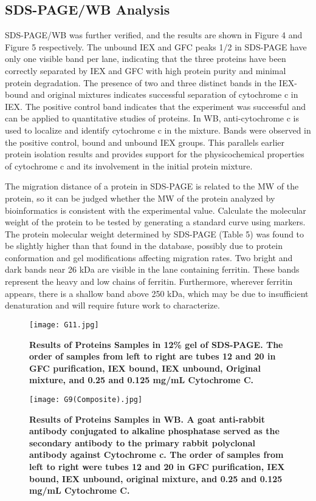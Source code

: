 \documentclass[a4paper,10pt]{article}
\begin{document}
\begin{multicols}{2}
\subsection{SDS-PAGE/WB Analysis}
SDS-PAGE/WB was further verified, and the results are shown in Figure 4 and Figure 5 respectively. The unbound IEX and GFC peaks 1/2 in SDS-PAGE have only one visible band per lane, indicating that the three proteins have been correctly separated by IEX and GFC with high protein purity and minimal protein degradation. The presence of two and three distinct bands in the IEX-bound and original mixtures indicates successful separation of cytochrome c in IEX. The positive control band indicates that the experiment was successful and can be applied to quantitative studies of proteins. In WB, anti-cytochrome c is used to localize and identify cytochrome c in the mixture. Bands were observed in the positive control, bound and unbound IEX groups. This parallels earlier protein isolation results and provides support for the physicochemical properties of cytochrome c and its involvement in the initial protein mixture.


The migration distance of a protein in SDS-PAGE is related to the MW of the protein, so it can be judged whether the MW of the protein analyzed by bioinformatics is consistent with the experimental value. Calculate the molecular weight of the protein to be tested by generating a standard curve using markers. The protein molecular weight determined by SDS-PAGE (Table 5) was found to be slightly higher than that found in the database, possibly due to protein conformation and gel modifications affecting migration rates. Two bright and dark bands near 26 kDa are visible in the lane containing ferritin. These bands represent the heavy and low chains of ferritin. Furthermore, wherever ferritin appears, there is a shallow band above 250 kDa, which may be due to insufficient denaturation and will require future work to characterize.


\begin{figure}[H]
\centering
\texttt{[image: G11.jpg]}
\caption{\scriptsize \textbf{Results of Proteins Samples in 12\% gel of SDS-PAGE. The order of samples from left to right are tubes 12 and 20 in GFC purification, IEX bound, IEX unbound, Original mixture, and 0.25 and 0.125 mg/mL Cytochrome C.}}
\label{fig5}
\end{figure}


\begin{figure}[H]
\centering
\texttt{[image: G9(Composite).jpg]}
\caption{\scriptsize \textbf{Results of Proteins Samples in WB. A goat anti-rabbit antibody conjugated to alkaline phosphatase served as the secondary antibody to the primary rabbit polyclonal antibody against Cytochrome c. The order of samples from left to right were tubes 12 and 20 in GFC purification, IEX bound, IEX unbound, original mixture, and 0.25 and 0.125 mg/mL Cytochrome C.}}
\label{fig6}
\end{figure}



\end{multicols}
\end{document}
